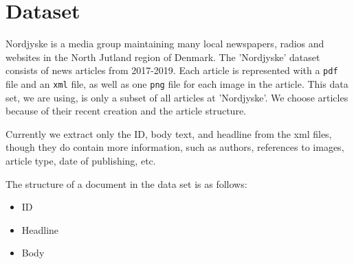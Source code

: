 \section{Dataset}
Nordjyske is a media group maintaining many local newspapers, radios and websites in the North Jutland region of Denmark.
The 'Nordjyske' dataset consists of news articles from 2017-2019. 
Each article is represented with a \texttt{pdf} file and an \texttt{xml} file, as well as one \texttt{png} file for each image in the article.
This data set, we are using, is only a subset of all articles at 'Nordjyske'.
We choose articles because of their recent creation and the article structure.

Currently we extract only the ID, body text, and headline from the xml files, though they do contain more information, such as authors, references to images, article type, date of publishing, etc.

The structure of a document in the data set is as follows:
\begin{itemize}
	\item ID
	\item Headline
	\item Body
\end{itemize}
